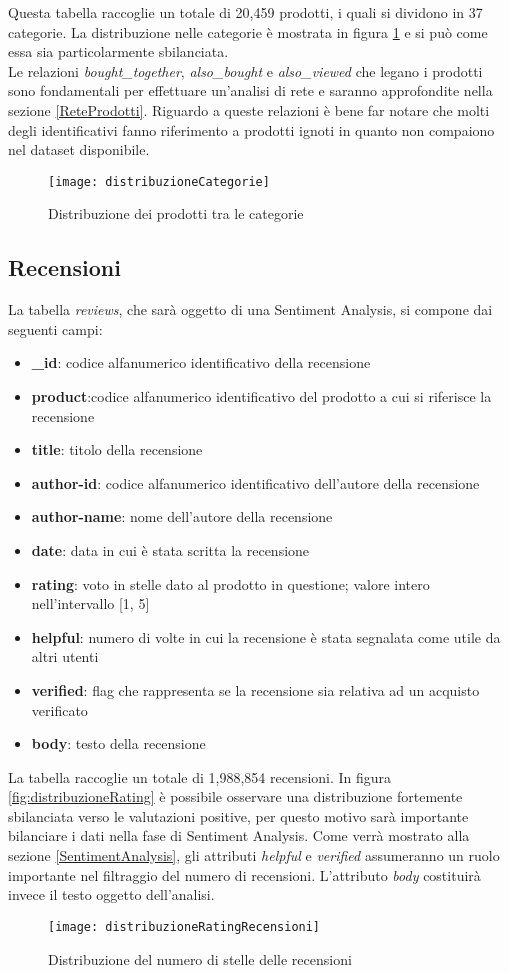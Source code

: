 Questa tabella raccoglie un totale di 20,459 prodotti, i quali si dividono in 37 categorie. La distribuzione nelle categorie è mostrata in figura \ref{fig:distribuzioneCategorie} e si può come essa sia particolarmente sbilanciata. \\
Le relazioni \textit{bought\_together}, \textit{also\_bought} e \textit{also\_viewed} che legano i prodotti sono fondamentali per effettuare un'analisi di rete e saranno approfondite nella sezione \ref{ReteProdotti}. Riguardo a queste relazioni è bene far notare che molti degli identificativi fanno riferimento a prodotti ignoti in quanto non compaiono nel dataset disponibile.

\begin{figure}[H]
    \texttt{[image: distribuzioneCategorie]}\centering
    \caption{Distribuzione dei prodotti tra le categorie}\label{fig:distribuzioneCategorie}
\end{figure}

\subsection{Recensioni}\label{Recensioni}
La tabella \textit{reviews}, che sarà oggetto di una Sentiment Analysis, si compone dai seguenti campi:
\begin{itemize}
    \item \textbf{\_id}: codice alfanumerico identificativo della recensione
    \item \textbf{product}:codice alfanumerico identificativo del prodotto a cui si riferisce la recensione
    \item \textbf{title}: titolo della recensione
    \item \textbf{author-id}: codice alfanumerico identificativo dell'autore della recensione
    \item \textbf{author-name}: nome dell'autore della recensione
    \item \textbf{date}: data in cui è stata scritta la recensione
    \item \textbf{rating}: voto in stelle dato al prodotto in questione; valore intero nell'intervallo [1, 5]
    \item \textbf{helpful}: numero di volte in cui la recensione è stata segnalata come utile da altri utenti
    \item \textbf{verified}: flag che rappresenta se la recensione sia relativa ad un acquisto verificato
    \item \textbf{body}: testo della recensione
\end{itemize} 
La tabella raccoglie un totale di 1,988,854 recensioni. In figura \ref{fig:distribuzioneRating} è possibile osservare una distribuzione fortemente sbilanciata verso le valutazioni positive, per questo motivo sarà importante bilanciare i dati nella fase di Sentiment Analysis. Come verrà mostrato alla sezione \ref{SentimentAnalysis}, gli attributi \textit{helpful} e \textit{verified} assumeranno un ruolo importante nel filtraggio del numero di recensioni. L'attributo \textit{body} costituirà invece il testo oggetto dell'analisi.

\begin{figure}[H]
    \texttt{[image: distribuzioneRatingRecensioni]}\centering
    \caption{Distribuzione del numero di stelle delle recensioni}\label{fig:distribuzioneRatingRecensioni}
\end{figure}